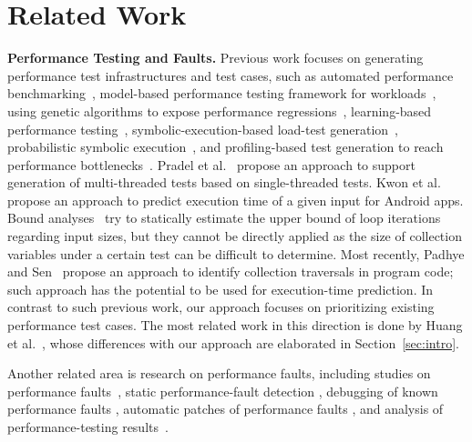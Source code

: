 
	\vspace{-0.2cm}
\section{Related Work}
\label{sec:related}
	\vspace{-0.1cm}
	
\textbf{Performance Testing and Faults.} Previous work focuses on generating performance test infrastructures and test cases, such as automated performance benchmarking~\cite{KALIBERA}, model-based performance testing framework for workloads~\cite{BARNA11}, using genetic algorithms to expose performance regressions~\cite{LUO16}, learning-based performance testing~\cite{GRECHANIK12}, symbolic-execution-based load-test generation~\cite{ZHANG11}, probabilistic symbolic execution~\cite{Chen2016}, and profiling-based test generation to reach performance bottlenecks~\cite{luoinput2016}. Pradel et al.~\cite{PradelISSTA2014} propose  an approach to support generation of multi-threaded tests based on single-threaded tests. Kwon et al.~\cite{ATC2013} propose an approach to predict execution time of a given input for Android apps. Bound analyses~\cite{SPEED} try to statically estimate the upper bound of loop iterations regarding input sizes, but they cannot be directly applied as the size of collection variables under a  certain test can be difficult to determine. Most recently, Padhye and Sen~\cite{PadhyeICSE2017} propose an  approach to identify collection traversals in program code; such approach has the potential to be used for execution-time prediction. In contrast to such previous work, our approach focuses on prioritizing existing performance test cases. The most related work in this direction is done by Huang et al.~\cite{huang2014performance}, whose differences with our approach are elaborated in Section~\ref{sec:intro}. 

Another related area is research on performance faults, including studies on performance faults~\cite{JIN12, PerfBugStudy}, static performance-fault detection \cite{Nistor14, JOVIC11, KILLIAN10, YAN12}, debugging of known performance faults \cite{SHEN05,HAN12,LEUNG07,AGUILERA03}, automatic patches of performance faults \cite{Nistor15}, and analysis of performance-testing results~\cite{FOO11,FOO10}. 



